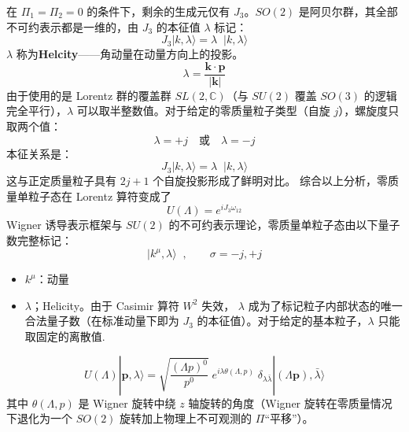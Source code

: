 在 $\Pi_1 = \Pi_2 = 0$ 的条件下，剩余的生成元仅有 $J_3$。$SO(2)$ 是阿贝尔群，其全部不可约表示都是一维的，由 $J_3$ 的本征值 $\lambda$ 标记：
\begin{equation}
J_3|k,\lambda\rangle = \lambda\;\;|k,\lambda\rangle
\end{equation}
$\lambda$ 称为\textbf{Helcity}——角动量在动量方向上的投影。
\begin{equation}
\lambda = \frac{\pmb{k} \cdot \pmb{p}}{|\pmb{k}|}
\end{equation}
由于使用的是 Lorentz 群的覆盖群 $SL(2,\mathbb{C})$（与 $SU(2)$ 覆盖 $SO(3)$ 的逻辑完全平行），$\lambda$ 可以取半整数值。对于给定的零质量粒子类型（自旋 $j$），螺旋度只取两个值：
\begin{equation}
\lambda = +j \quad \text{或} \quad \lambda = -j
\end{equation}
本征关系是：
\begin{equation}
  J_3|k,\lambda\rangle = \lambda\;\;|k,\lambda\rangle
\end{equation}
这与正定质量粒子具有 $2j+1$ 个自旋投影形成了鲜明对比。
综合以上分析，零质量单粒子态在 Lorentz 算符变成了
\begin{equation}
    U(\Lambda)=e^{iJ_3\omega_{12}}
\end{equation}
 Wigner 诱导表示框架与 $SU(2)$ 的不可约表示理论，零质量单粒子态由以下量子数完整标记：
\begin{equation}
|k^\mu,\lambda\rangle\;\;,\qquad \sigma = -j,+j
\end{equation}
\begin{itemize}
    \item $k^\mu$：动量
    \item $\lambda$；Helicity。由于 Casimir 算符 $W^2$ 失效，  $\lambda$ 成为了标记粒子内部状态的唯一合法量子数（在标准动量下即为 $J_3$ 的本征值）。对于给定的基本粒子，$\lambda$ 只能取固定的离散值.\normalcolor
\end{itemize}
\begin{equation}
U(\Lambda)|\boldsymbol{p},\lambda\rangle
= \sqrt{\frac{(\Lambda p)^0}{p^0}}\;
e^{i\lambda\theta(\Lambda,p)}\;\delta_{\lambda\bar{\lambda}}
|(\Lambda\boldsymbol{p}),\bar{\lambda}\rangle
\end{equation}
其中 $\theta(\Lambda,p)$ 是 Wigner 旋转中绕 $z$ 轴旋转的角度（Wigner 旋转在零质量情况下退化为一个 $SO(2)$ 旋转加上物理上不可观测的 $\Pi$``平移''）。
